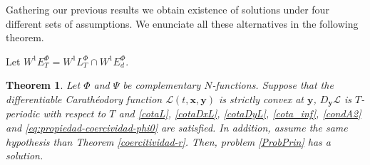 \documentclass[twoside]{article}
\newtheorem{thm}{Theorem}[section]
\theoremstyle{remark}
\newcommand{\lphi}{L^{\Phi}}
\newcommand{\ephi}{E^{\Phi}}
\newcommand{\wphi}{W^{1}\lphi}
\newcommand{\wphiet}{W^{1}\ephi_T}
\newcommand{\wphie}{W^{1}\ephi}
\renewcommand{\b}[1]{\boldsymbol{#1}}
\begin{document}
Gathering our previous results we obtain existence of solutions under four different sets of assumptions. We enunciate all these alternatives in the following theorem. 

Let $\wphiet=\wphi_T \cap \wphie_d$.


\begin{thm} 
Let $\Phi$ and $\Psi$ be complementary $N$-functions. 
Suppose that the differentiable Carath\'eodory function $\mathcal{L}(t,\b{x},\b{y})$ is strictly convex at $\b{y}$, $D_{\b{y}}\mathcal{L}$ is $T$-periodic with respect to $T$  and \eqref{cotaL}, \eqref{cotaDxL}, \eqref{cotaDyL}, \eqref{cota_inf}, \eqref{condA2} and \eqref{eq:propiedad-coercividad-phi0} are satisfied. In addition, assume the same hypothesis than Theorem \ref{coercitividad-r}. Then, problem \eqref{ProbPrin} has a solution.
\end{thm}
\end{document}
